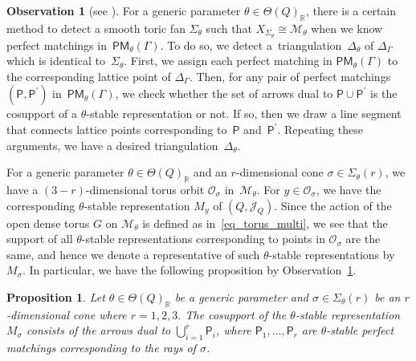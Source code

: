 \documentclass[pdftex]{sigma}
\numberwithin{equation}{section}
\newtheorem{Proposition}[Theorem]{Proposition}
\theoremstyle{definition}
\newtheorem{Observation}[Theorem]{Observation}
\newcommand{\RR}{\mathbb{R}}
\newcommand{\calJ}{\mathcal{J}}
\newcommand{\calM}{\mathcal{M}}
\newcommand{\calO}{\mathcal{O}}
\newcommand{\sfP}{\mathsf{P}}
\newcommand{\PM}{\mathsf{PM}}
\begin{document}
\begin{Observation}[{see \cite[Proposition~4.15 and the last part of Section~4]{Moz}}] \label{method_make_triangulation}
For a generic parameter $\theta\in\Theta(Q)_\RR$,
there is a certain method to detect a smooth toric fan $\Sigma_\theta$ such that ${X_{\Sigma_\theta}\cong\calM_\theta}$ when we know perfect matchings in~$\PM_\theta(\Gamma)$.
To do so, we detect a~triangulation~$\Delta_\theta$ of $\Delta_\Gamma$ which is identical to~$\Sigma_\theta$.
First, we assign each perfect matching in $\PM_\theta(\Gamma)$ to the corresponding lattice point of $\Delta_\Gamma$.
Then, for any pair of perfect matchings~$(\sfP,\sfP^\prime)$ in~$\PM_\theta(\Gamma)$, we check whether the set of arrows dual to $\sfP\cup \sfP^\prime$
is the cosupport of a $\theta$-stable representation or not.
If so, then we draw a line segment that connects lattice points corresponding to~$\sfP$ and~$\sfP^\prime$.
Repeating these arguments, we have a desired triangulation~$\Delta_\theta$.
\end{Observation}

For a generic parameter $\theta\in\Theta(Q)_\RR$ and an $r$-dimensional cone $\sigma\in\Sigma_\theta(r)$,
we have a $(3-r)$-dimensional torus orbit $\calO_\sigma$ in~$\calM_\theta$.
For $y\in\calO_\sigma$, we have the corresponding $\theta$-stable representation $M_y$ of $(Q, \calJ_Q)$.
Since the action of the open dense torus $G$ on $\calM_\theta$ is defined as in~\eqref{eq_torus_multi},
we see that the support of all $\theta$-stable representations corresponding to points in $\calO_\sigma$ are the same,
and hence we denote a representative of such $\theta$-stable representations by $M_\sigma$.
In particular, we have the following proposition by Observation~\ref{method_make_triangulation}.

\begin{Proposition}\label{prop_stablerep_cosupport}
Let $\theta\in\Theta(Q)_\RR$ be a generic parameter and $\sigma\in\Sigma_\theta(r)$ be an $r$-dimensional cone where $r=1,2,3$.
The cosupport of the $\theta$-stable representation $M_\sigma$
consists of the arrows dual to $\bigcup_{i=1}^r\sfP_i$, where $\sfP_1, \dots, \sfP_r$ are $\theta$-stable perfect matchings corresponding to the rays of $\sigma$.
\end{Proposition}
\end{document}
